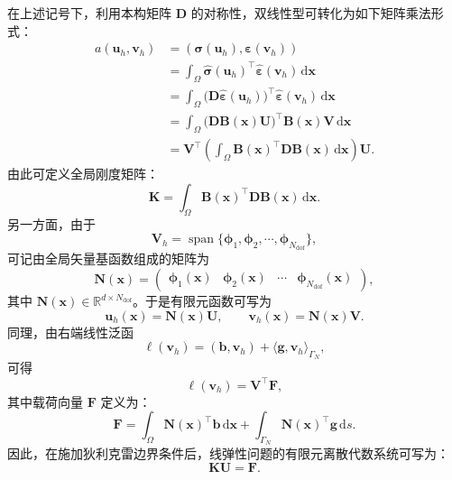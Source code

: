 在上述记号下，利用本构矩阵 $\boldsymbol{D}$ 的对称性，双线性型可转化为如下矩阵乘法形式：
\[
\begin{aligned} 
	a(\boldsymbol{u}_h,\boldsymbol{v}_h) &=(\boldsymbol{\sigma}(\boldsymbol{u}_h),\boldsymbol{\varepsilon}(\boldsymbol{v}_h))\\ &=\int_{\Omega}\hat{\boldsymbol{\sigma}}(\boldsymbol{u}_h)^{\top}\hat{\boldsymbol{\varepsilon}}(\boldsymbol{v}_h)\,\mathrm{d}\boldsymbol{x}\\ &=\int_{\Omega}\bigl(\boldsymbol{D}\hat{\boldsymbol{\varepsilon}}(\boldsymbol{u}_h)\bigr)^{\top}\hat{\boldsymbol{\varepsilon}}(\boldsymbol{v}_h)\,\mathrm{d}\boldsymbol{x}\\ &=\int_{\Omega}\bigl(\boldsymbol{D}\boldsymbol{B}(\boldsymbol{x})\boldsymbol{U}\bigr)^{\top}\boldsymbol{B}(\boldsymbol{x})\boldsymbol{V}\,\mathrm{d}\boldsymbol{x}\\ &=\boldsymbol{V}^{\top}\left(\int_{\Omega}\boldsymbol{B}(\boldsymbol{x})^{\top}\boldsymbol{D}\boldsymbol{B}(\boldsymbol{x})\,\mathrm{d}\boldsymbol{x}\right)\boldsymbol{U}. 
\end{aligned}
\]
由此可定义全局刚度矩阵：
\begin{equation} \label{eq:ch3_global_stiffness_matrix}
	\boldsymbol{K} = \int_{\Omega}\boldsymbol{B}(\boldsymbol{x})^{\top}\boldsymbol{D}\boldsymbol{B}(\boldsymbol{x})\,\mathrm{d}\boldsymbol{x}.
\end{equation}
另一方面，由于
\[
\boldsymbol{V}_h = \operatorname{span}\{\boldsymbol{\phi}_1,\boldsymbol{\phi}_2,\cdots,\boldsymbol{\phi}_{N_{\mathrm{dof}}}\},
\]
可记由全局矢量基函数组成的矩阵为
\[
\boldsymbol{N}(\boldsymbol{x}) = 
\begin{pmatrix} 
	\boldsymbol{\phi}_1(\boldsymbol{x})& \boldsymbol{\phi}_2(\boldsymbol{x})& \cdots& \boldsymbol{\phi}_{N_{\mathrm{dof}}}(\boldsymbol{x}) 
\end{pmatrix},
\]
其中 $\boldsymbol{N}(\boldsymbol{x})\in\mathbb{R}^{d\times N_{\mathrm{dof}}}$。于是有限元函数可写为
\[
\boldsymbol{u}_h(\boldsymbol{x})=\boldsymbol{N}(\boldsymbol{x})\boldsymbol{U}, \qquad \boldsymbol{v}_h(\boldsymbol{x})=\boldsymbol{N}(\boldsymbol{x})\boldsymbol{V}.
\]
同理，由右端线性泛函
\[
\ell(\boldsymbol{v}_h) = (\boldsymbol{b},\boldsymbol{v}_h) + \langle \boldsymbol{g},\boldsymbol{v}_h\rangle_{\Gamma_N},
\]
可得
\[
\ell(\boldsymbol{v}_h) = \boldsymbol{V}^{\top}\boldsymbol{F},
\]
其中载荷向量 $\boldsymbol{F}$ 定义为：
\begin{equation} \label{eq:ch3_global_load_vector}
	\boldsymbol{F} = \int_{\Omega}\boldsymbol{N}(\boldsymbol{x})^{\top}\boldsymbol{b}\,\mathrm{d}\boldsymbol{x} + \int_{\Gamma_N}\boldsymbol{N}(\boldsymbol{x})^{\top}\boldsymbol{g}\,\mathrm{d}s.
\end{equation}
因此，在施加狄利克雷边界条件后，线弹性问题的有限元离散代数系统可写为：
\begin{equation} \label{eq:ch3_fem_algebraic_system}
	\boldsymbol{K}\boldsymbol{U} = \boldsymbol{F}.
\end{equation}

